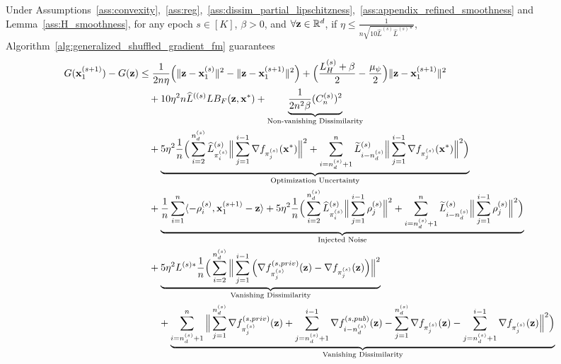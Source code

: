 \begin{lemma}
\label{lemma:one_epoch_convergence}
    Under Assumptions~\ref{ass:convexity},~\ref{ass:reg},~\ref{ass:dissim_partial_lipschitzness},~\ref{ass:appendix_refined_smoothness} and Lemma~\ref{ass:H_smoothness}, for any epoch $s\in [K]$, $\beta > 0$, and $\forall {\mathbf{z}} \in \mathbb{R}^d$, 
    if $\eta \leq \frac{1}{n\sqrt{10 \widehat{L}^{(s)} \widehat{L}^{(s)*}}}$, 
    Algorithm~\ref{alg:generalized_shuffled_gradient_fm} guarantees
        \begin{align}
        G({\mathbf{x}}_1^{(s+1)}) - G({\mathbf{z}})
        &\leq \frac{1}{2 n \eta}\Big( \|{\mathbf{z}} - {\mathbf{x}}_1^{(s)}\|^2  - \|{\mathbf{z}} - {\mathbf{x}}_1^{(s+1)}\|^2 \Big)
        + \Big( \frac{L_H^{(s)} + \beta}{2} - \frac{\mu_{\psi}}{2} \Big)\| {\mathbf{z}} - {\mathbf{x}}_1^{(s+1)}\|^2
        \\
        \nonumber
        &\quad + 10 \eta^2 n \widehat{L}^{((s)} L B_F({\mathbf{z}}, {\mathbf{x}}^*) 
        + \underbrace{ \frac{1}{2n^2 \beta}(C_n^{(s)})^2 }_{\text{Non-vanishing Dissimilarity}}
 \\
        \nonumber
        &\quad
        + \underbrace{ 5 \eta^2 \frac{1}{n} \Big(\sum_{i=2}^{n_d^{(s)}}\widehat{L}_{\pi_i^{(s)}}^{(s)}\Big\| \sum_{j=1}^{i-1} \nabla f_{\pi_j^{(s)}}({\mathbf{x}}^*)\Big\|^2
        + \sum_{i=n_d^{(s)}+1}^{n}\widetilde{L}_{i-n_d^{(s)}}^{(s)}\Big\| \sum_{j=1}^{i-1}\nabla f_{\pi_j^{(s)}}({\mathbf{x}}^*)\Big\|^2 \Big)
        }_{\text{Optimization Uncertainty}}\\
        \nonumber
        &\quad + \underbrace{ \frac{1}{n}\sum_{i=1}^{n}\langle -\rho_i^{(s)}, {\mathbf{x}}_1^{(s+1)} - {\mathbf{z}}\rangle
        + 5\eta^2 \frac{1}{n} \Big( \sum_{i=2}^{n_d^{(s)}} \widehat{L}_{\pi_i^{(s)}}^{(s)} \Big\| \sum_{j=1}^{i-1} \rho_j^{(s)}\Big\|^2
        + \sum_{i=n_d^{(s)}+1}^{n} \widetilde{L}_{i-n_d^{(s)}}^{(s)}\Big\| \sum_{j=1}^{i-1} \rho_j^{(s)}\Big\|^2\Big)
        }_{\text{Injected Noise}}\\
    \nonumber
        &\quad + \underbrace{5\eta^2 L^{(s)*} \frac{1}{n}\Big(\sum_{i=2}^{n_d^{(s)}}
        \Big\| \sum_{j=1}^{i-1} \Big( \nabla f_{\pi_j^{(s)}}^{(s, priv)}({\mathbf{z}}) - \nabla f_{\pi_j^{(s)}}({\mathbf{z}})\Big) \Big\|^2
        }_{\text{Vanishing Dissimilarity}}
        \\
        \nonumber
        &\quad \quad + \underbrace{ \sum_{i=n_d^{(s)} + 1}^{n} \Big\| \sum_{j=1}^{n_d^{(s)}} \nabla f_{\pi_j^{(s)}}^{(s, priv)}({\mathbf{z}}) + \sum_{j=n_d^{(s)}+1}^{i-1} \nabla f_{i-n_d^{(s)}}^{(s, pub)}({\mathbf{z}})
            - \sum_{j=1}^{n_d^{(s)}} \nabla f_{\pi_j^{(s)}}({\mathbf{z}}) - \sum_{j=n_d^{(s)}+1}^{i-1} \nabla f_{\pi_j^{(s)}}({\mathbf{z}})
        \Big\|^2
        \Big)
        }_{\text{Vanishing Dissimilarity}}
    \end{align}

\end{lemma}


